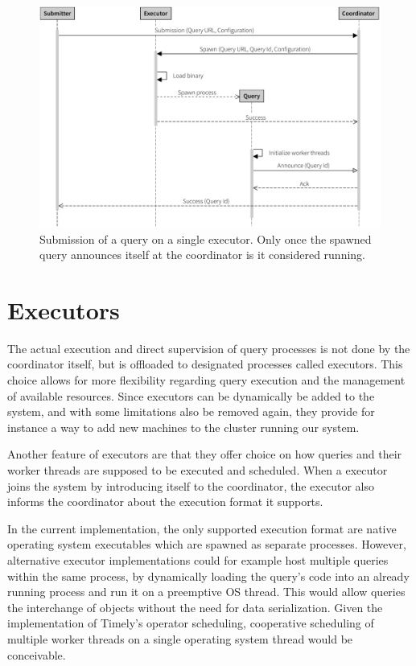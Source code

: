 \begin{figure}[htb]
  \centering
    \includegraphics[width=1\textwidth]{figures/spawn_singleprocess}
  \caption[Query submission with single process.]{Submission of a query on a single executor.
  Only once the spawned query announces itself at the coordinator is it considered running.}
  \label{fig:subsingle}
\end{figure}

\section{Executors}

The actual execution and direct supervision of query processes is not done by the
coordinator itself, but is offloaded to designated processes called executors.
This choice allows for more flexibility regarding query execution and the
management of available resources. Since executors can be dynamically be added
to the system, and with some limitations also be removed again, they provide
for instance a way to add new machines to the cluster running our system.

Another feature of executors are that they offer choice on how queries and their
worker threads are supposed to be executed and scheduled. When a executor joins
the system by introducing itself to the coordinator, the executor also informs
the coordinator about the execution format it supports.

In the current implementation, the only supported execution format are native
operating system executables which are spawned as separate processes. However,
alternative executor implementations could for example host multiple queries
within the same process, by dynamically loading the query's code into an already
running process and run it on a preemptive OS thread. This would allow queries
the interchange of objects without the need for data serialization. Given
the implementation of Timely's operator scheduling, cooperative scheduling
of multiple worker threads on a single operating system thread would be
conceivable.

